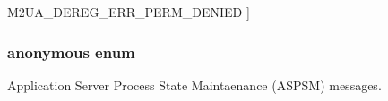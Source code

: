 \begin{Desc}
\begin{description}
{M2\+U\+A\+\_\+\+D\+E\+R\+E\+G\+\_\+\+E\+R\+R\+\_\+\+P\+E\+R\+M\+\_\+\+D\+E\+N\+I\+ED\label{m2ua__types_8h_a80155586fa275b28773c9b203f52cabaafc1261b56706474f23a9f19f7fb9f66e}
}]\item[{\em 
M2\+U\+A\+\_\+\+D\+E\+R\+E\+G\+\_\+\+E\+R\+R\+\_\+\+N\+O\+T\+\_\+\+R\+EG\label{m2ua__types_8h_a80155586fa275b28773c9b203f52cabaa9713a7d3caceb4a632e9244d66485630}
}]\end{description}
\end{Desc}
\subsubsection[{anonymous enum}]{\setlength{\rightskip}{0pt plus 5cm}anonymous enum}\label{m2ua__types_8h_a99fb83031ce9923c84392b4e92f956b5}


Application Server Process State Maintaenance (A\+S\+P\+SM) messages. 


